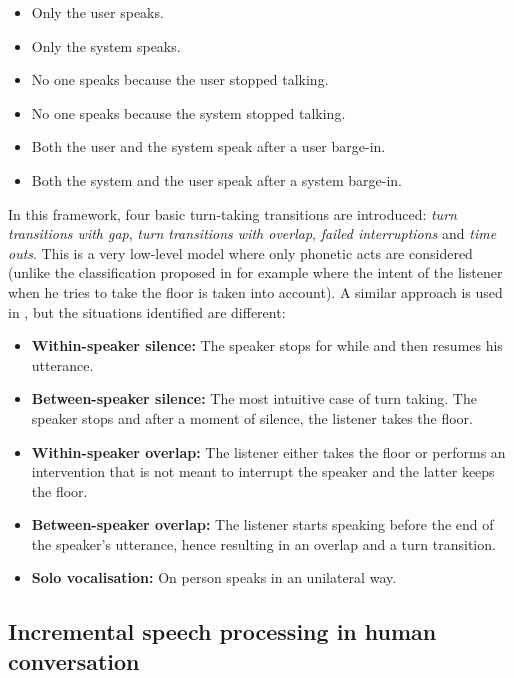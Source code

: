         \begin{itemize}
          \item Only the user speaks.
          \item Only the system speaks.
          \item No one speaks because the user stopped talking.
          \item No one speaks because the system stopped talking.
          \item Both the user and the system speak after a user barge-in.
          \item Both the system and the user speak after a system barge-in.
        \end{itemize}
				
				In this framework, four basic turn-taking transitions are introduced: \textit{turn transitions with gap}, \textit{turn transitions with overlap}, \textit{failed interruptions} and \textit{time outs}. This is a very low-level model where only phonetic acts are considered (unlike the classification proposed in \cite{Beattie1982} for example where the intent of the listener when he tries to take the floor is taken into account). A similar approach is used in \cite{Wlodarczak2013}, but the situations identified are different:

        \begin{itemize}
           \item \textbf{Within-speaker silence:} The speaker stops for while and then resumes his utterance.
           \item \textbf{Between-speaker silence:} The most intuitive case of turn taking. The speaker stops and after a moment of silence, the listener takes the floor.
           \item \textbf{Within-speaker overlap:} The listener either takes the floor or performs an intervention that is not meant to interrupt the speaker and the latter keeps the floor.
           \item \textbf{Between-speaker overlap:} The listener starts speaking before the end of the speaker's utterance, hence resulting in an overlap and a turn transition.
           \item \textbf{Solo vocalisation:} On person speaks in an unilateral way.
        \end{itemize}
				
	\subsection{Incremental speech processing in human conversation}
	\label{soa:inchuman}

